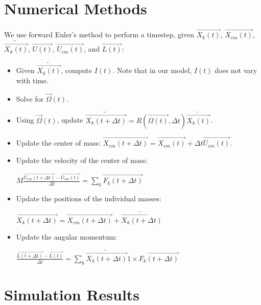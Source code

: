 \documentclass[12pt]{article}
\begin{document}
\section{Numerical Methods}
We use forward Euler's method to perform a timestep, given $\vec{X_{k}(t)}$, $\vec{X_{cm}(t)}$, $\tilde{\vec{X_{k}(t)}}$, $\vec{U(t)}$, $\vec{U_{cm}(t)}$, and $\vec{L(t)}$:\\
\begin{itemize}
  \item Given $\tilde{\vec{X_{k}(t)}}$, compute $I(t)$. Note that in our model, $I(t)$ does not vary with time.
  \item Solve for $\vec\Omega(t)$.
  \item Using $\vec\Omega(t)$, update $\tilde{\vec{X_{k}(t+\Delta{t})}}=R(\vec{\Omega(t)},\Delta{t})\tilde{\vec{X_{k}(t)}}$.
  \item Update the center of mass: $\vec{X_{cm}(t+\Delta{t})}=\vec{X_{cm}(t)}+\Delta{t}\vec{U_{cm}(t)}$.
  \item Update the velocity of the center of mass: 
\begin{center}
$M\frac{\vec{U_{cm}(t+\Delta{t})}-\vec{U_{cm}(t)}}{\Delta{t}}=\sum_{k}\vec{F_{k}(t+\Delta{t})}$
\end{center}
  \item Update the positions of the individual masses: 
\begin{center}
$\vec{X_{k}(t+\Delta{t})}=\vec{X_{cm}(t+\Delta{t})}+\tilde{\vec{X_{k}(t+\Delta{t})}}$
\end{center}
  \item Update the angular momentum:
\begin{center}
$\frac{\vec{L(t+\Delta{t})}-\vec{L(t)}}{\Delta{t}}=\sum_{k}\tilde{\vec{X_{k}(t+\Delta{t})}}1\times\vec{F_{k}(t+\Delta{t})}$
\end{center}
\end{itemize}
\section{Simulation Results}
\end{document}
